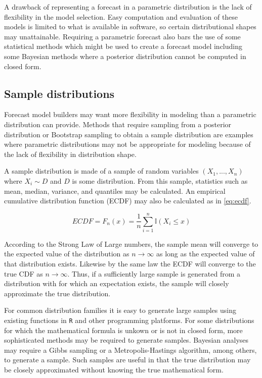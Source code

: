 \documentclass[11pt,notitlepage]{isuthesis}
\begin{document}
A drawback of representing a forecast in a parametric distribution is the lack 
of flexibility in the model selection. Easy computation and evaluation of these 
models is limited to what is available in software, so certain distributional
shapes may unattainable.
Requiring a parametric forecast also bars the use of some statistical methods
which might be used to create a forecast model including some Bayesian methods
where a posterior distribution cannot be computed in closed form.


\subsection{Sample distributions}
Forecast model builders may want more flexibility in modeling than a 
parametric 
distribution can provide. Methods that require sampling from a posterior 
distribution or Bootstrap sampling to obtain a sample distribution are examples
where parametric distributions may not be appropriate for modeling because of 
the lack of flexibility in distribution shape.

A sample distribution is made of a sample of random variables 
$(X_1,...,X_n)$ where $X_i \sim D$ and $D$ is some distribution. From this 
sample,
statistics such as mean, median, variance, and quantiles may be calculated. 
An empirical cumulative distribution function (ECDF) may also be calculated as
in \eqref{eq:ecdf}.

\begin{equation}
\label{eq:ecdf}
  ECDF = F_n(x) = \frac{1}{n} \sum_{i=1}^n \mathbb{I}(X_i \leq x)
\end{equation}

According to the Strong Law of Large numbers, the sample mean will converge to
the expected value of the distribution as $n \rightarrow \infty$ as long as the 
expected value of that distribution exists. Likewise by the same law the 
ECDF will converge to the true CDF 
as $n \rightarrow \infty$. Thus, if a sufficiently large 
sample is generated from a distribution with for which an expectation exists, 
the sample will closely approximate the 
true distribution. 

For common distribution families it is easy to generate large samples using 
existing functions in \texttt{R} and other programming platforms. For some 
distributions 
for which the mathematical formula is unkown or is not in closed form, more 
sophisticated methods may be required to generate samples. Bayesian analyses may 
require a Gibbs sampling or a Metropolis-Hastings algorithm, among others, 
to generate a 
sample. Such samples are useful in that the true distribution may be closely 
approximated without knowing the true mathematical form. 
\end{document}
